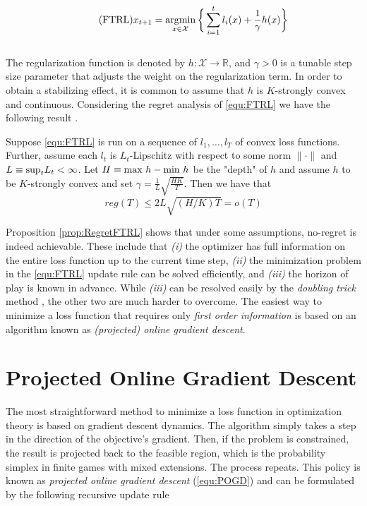\begin{equation}
    \tag{FTRL}
    x_{t+1} = \operatorname*{\arg\!\min}_{x \in \mathcal{X}} \bigg\{\sum_{i=1}^t l_i(x) + \frac{1}{\gamma}h(x)\bigg\}
    \label{equ:FTRL}
\end{equation} \\

The regularization function is denoted by $h: \mathcal{X} \to \mathbb{R}$, and $\gamma > 0$ is a tunable step size parameter that adjusts the weight on the regularization term. In order to obtain a stabilizing effect, it is common to assume that $h$ is $K$-strongly convex and continuous. Considering the regret analysis of \ref{equ:FTRL} we have the following result \cite[Theorem 2.1]{HDRmertikopoulos}.

\begin{proposition}\label{prop:RegretFTRL}
    Suppose \ref{equ:FTRL} is run on a sequence of $l_1,\dots,l_T$ of convex loss functions. Further, assume each $l_t$ is $L_t$-Lipschitz with respect to some norm $\|\cdot\|$ and $L \equiv \textnormal{sup}_t L_t < \infty$. Let $H \equiv \textnormal{max } h-\textnormal{min } h$ be the "depth" of $h$ and assume $h$ to be $K$-strongly convex and set $\gamma = \frac{1}{L}\sqrt{\frac{HK}{T}}$. Then we have that
    \[reg(T) \le 2L\sqrt{(H/K)T} = o(T)\]
\end{proposition} 

Proposition \ref{prop:RegretFTRL} shows that under some assumptions, no-regret is indeed achievable. These include that \textit{(i)} the optimizer has full information on the entire loss function up to the current time step, \textit{(ii)} the minimization problem in the \ref{equ:FTRL} update rule can be solved efficiently, and \textit{(iii)} the horizon of play is known in advance. While \textit{(iii)} can be resolved easily by the \textit{doubling trick} method \cite{shalev}, the other two are much harder to overcome. The easiest way to minimize a loss function that requires only \textit{first order information} is based on an algorithm known as \textit{(projected) online gradient descent}.


\section{Projected Online Gradient Descent}\label{section:ProjectedOnlineGradienDescent}

The most straightforward method to minimize a loss function in optimization theory is based on gradient descent dynamics. The algorithm simply takes a step in the direction of the objective's gradient. Then, if the problem is constrained, the result is projected back to the feasible region, which is the probability simplex in finite games with mixed extensions. The process repeats. This policy is known as \textit{projected online gradient descent} (\ref{equ:POGD}) and can be formulated by the following recursive update rule


